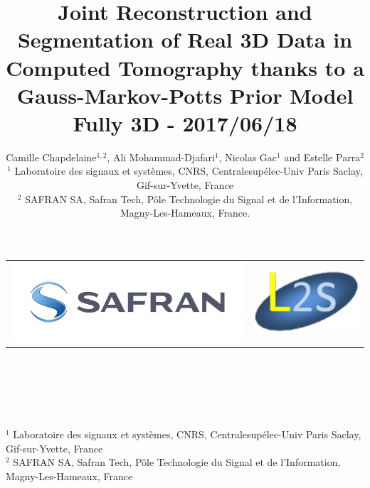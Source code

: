 \documentclass[latex]{beamer}
\title{Joint Reconstruction and Segmentation of Real 3D Data in Computed Tomography thanks to a Gauss-Markov-Potts Prior Model \\Fully 3D - 2017/06/18}
\author{Camille Chapdelaine$^{1,2}$, Ali Mohammad-Djafari$^1$, Nicolas Gac$^1$ and Estelle Parra$^2$ \\ 
\footnotesize $^1$
  Laboratoire des signaux et systèmes, CNRS, Centralesupélec-Univ Paris Saclay, Gif-sur-Yvette, France\\   
  \footnotesize $^2$
  SAFRAN SA, Safran Tech, P\^ole Technologie du Signal et de l'Information, Magny-Les-Hameaux, France.
}
\date{}
\begin{document}
\begin{frame}{} 
\bcc
\vspace*{-5mm}\begin{tabular}{cc}
\includegraphics[height=0.15\textheight]{logosafran} 
\hspace{0.15\textwidth} { }& 
\includegraphics[height=0.12\textheight]{logol2s} 
\end{tabular}
\\[18pt]
 \\~\\
 \\~\\  
\footnotesize $^1$
  Laboratoire des signaux et systèmes, CNRS, Centralesupélec-Univ Paris Saclay, Gif-sur-Yvette, France\\   
  \footnotesize $^2$
  SAFRAN SA, Safran Tech, P\^ole Technologie du Signal et de l'Information, Magny-Les-Hameaux, France
\ecc
\end{frame}
\end{document}
